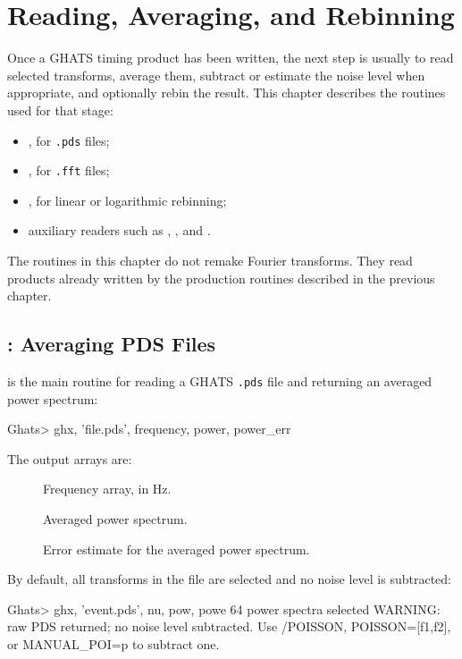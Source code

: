 \chapter{Reading, Averaging, and Rebinning}

Once a GHATS timing product has been written, the next step is usually to
read selected transforms, average them, subtract or estimate the noise level
when appropriate, and optionally rebin the result.  This chapter describes
the routines used for that stage:

\begin{itemize}
\item {}, for \texttt{.pds} files;
\item {}, for \texttt{.fft} files;
\item {}, for linear or logarithmic rebinning;
\item auxiliary readers such as , , and
  .
\end{itemize}

The routines in this chapter do not remake Fourier transforms.  They read
products already written by the production routines described in the previous
chapter.

\section{: Averaging PDS Files}

 is the main routine for reading a GHATS \texttt{.pds} file and
returning an averaged power spectrum:

\begin{ghatsconsole}
Ghats> ghx, 'file.pds', frequency, power, power_err
\end{ghatsconsole}

The output arrays are:

\begin{description}
\item[] Frequency array, in Hz.
\item[] Averaged power spectrum.
\item[] Error estimate for the averaged power spectrum.
\end{description}

By default, all transforms in the file are selected and no noise level is
subtracted:

\begin{ghatsconsole}
Ghats> ghx, 'event.pds', nu, pow, powe
  64 power spectra selected
WARNING: raw PDS returned; no noise level subtracted.
Use /POISSON, POISSON=[f1,f2], or MANUAL_POI=p to subtract one.
\end{ghatsconsole}

